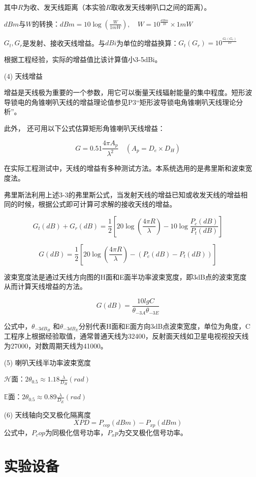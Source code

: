 \documentclass[12pt,hyperref,a4paper,UTF8]{ctexart}
\begin{document}
其中$R$为收、发天线距离（本实验$R$取收发天线喇叭口之间的距离）。

$dBm$与$W$的转换：$dBm = 10\log\left(\frac{W}{1mW}\right), \quad W = 10^{\frac{dBm}{10}} \times 1mW$

$G_t, G_r$是发射、接收天线增益。与$dBi$为单位的增益换算：$G_t(G_r) = 10^{\frac{G_t(G_r)}{10}}$

根据工程经验，实际的增益值比该计算值小3-5dBi。

(4) 天线增益

增益是天线极为重要的一个参数，用它可以衡量天线辐射能量的集中程度。短形波导锁电的角锥喇叭天线的增益理论值参见P3“矩形波导锁电角锥喇叭天线理论分析”。

此外， 还可用以下公式估算矩形角锥喇叭天线增益：

\[
G = 0.51 \frac{4\pi A_p}{\lambda^2} \quad (A_p = D_e \times D_H)
\]

在实际工程测试中，天线的增益有多种测试方法。本系统选用的是弗里斯和波束宽度法。

弗里斯法利用上述3-3的弗里斯公式，当发射天线的增益已知或收发天线的增益相同的时候，根据公式即可计算可求解的接收天线的增益。

\[
G_t(dB) + G_r(dB) = \frac{1}{2} \left[20\log \left( \frac{4\pi R}{\lambda}\right) - 10\log \frac{P_c(dB) } {P_t(dB)}\right]
\]

\[
G(dB) = \frac{1}{2}\left[20\log \left( \frac{4\pi R}{\lambda}\right) - (P_c(dB) - P_t(dB))\right]
\]

波束宽度法是通过天线方向图的H面和E面半功率波束宽度，即3dB点的波束宽度从而计算天线增益的方法。

\[
G(dB)=\frac{10lgC}{\theta_{-3A}\theta_{-3E}}
\]

公式中，$\theta_{-3dB_{H}}$ 和$\theta_{-3dB_{E}}$分别代表H面和E面方向3dB点波束宽度，单位为角度，C工程序上根据经验取值，通常普通天线为32400，反射面天线如卫星电视视投天线为27000，对数周期天线为41000。

(5) 喇叭天线半功率波束宽度


${\mathcal{H}}$面：$2\theta_{0.5}\approx1.18\frac\lambda{D_H}(rad)$

$\mathbb{E}$面：2$\theta_{0.5}\approx0.89\frac\lambda{D_E}(rad)$

(6) 天线轴向交叉极化隔离度
$$XPD=P_{cop}(dBm)-P_{xp}(dBm)$$
公式中，$P_cop$为同极化信号功率，$P_xp$为交叉极化信号功率。
\newpage


\section{实验设备}
\end{document}

